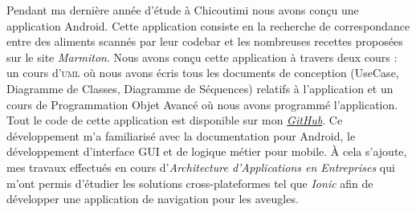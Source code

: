 Pendant ma dernière année d'étude à Chicoutimi nous avons conçu une application Android. Cette application consiste en la recherche de correspondance entre des aliments scannés par leur codebar et les nombreuses recettes proposées sur le site \textit{Marmiton}. Nous avons conçu cette application à travers deux cours : un cours d'\textsc{uml} où nous avons écris tous les documents de conception (UseCase, Diagramme de Classes, Diagramme de Séquences) relatifs à l'application et un cours de Programmation Objet Avancé où nous avons programmé l'application. Tout le code de cette application est disponible sur mon \href{https://github.com/vlnk/ShootYourFridge}{\textit{GitHub}}. Ce développement m'a familiarisé avec la documentation pour Android, le développement d'interface GUI et de logique métier pour mobile. À cela s'ajoute, mes travaux effectués en cours d'\textit{Architecture d'Applications en Entreprises} qui m'ont permis d'étudier les solutions cross-plateformes tel que \textit{Ionic} afin de développer une application de navigation pour les aveugles. \conclusion{}

\makeletterclosing
